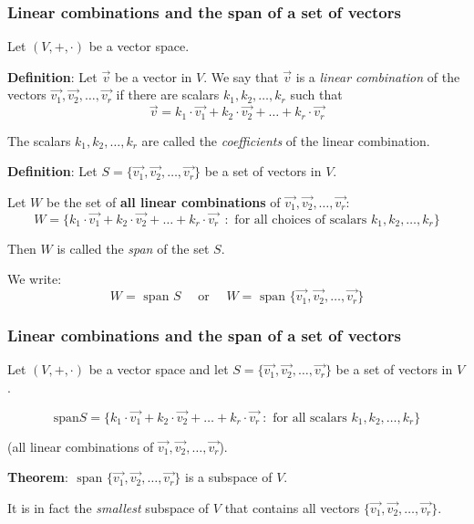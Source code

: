 \begin{frame}[fragile]
\frametitle{Linear combinations and the span of a set of vectors}

Let $(V, +, \cdot)$ be a vector space.



\textbf{Definition}: Let $\vec{v}$ be a vector in $V$. We say that $\vec{v}$ is a {\em linear combination} of the vectors $\vec{v_1}, \vec{v_2}, \ldots, \vec{v_r}$ if there are scalars $k_1, k_2, \ldots, k_r$ such that
$$\vec{v} = k_1 \cdot \vec{v_1} + k_2 \cdot \vec{v_2} + \ldots + k_r \cdot \vec{v_r}$$

The scalars $k_1, k_2, \ldots, k_r$ are called the {\em coefficients} of the linear combination.





\textbf{Definition}: Let $S = \{ \vec{v_1}, \vec{v_2}, \ldots, \vec{v_r} \}$ be a set of vectors in $V$.

Let $W$ be the set of \textbf{all linear combinations} of $\vec{v_1}, \vec{v_2}, \ldots, \vec{v_r}$:
$$W = \{  k_1 \cdot \vec{v_1} + k_2 \cdot \vec{v_2} + \ldots + k_r \cdot \vec{v_r} \ \  \colon  \text{ for all choices of scalars } k_1, k_2, \ldots, k_r \}$$

Then $W$ is called the {\em span} of the set $S$.

We write:
$$W = \text{ span } S  \quad \text{ or } \quad W = \text{ span }   \{ \vec{v_1}, \vec{v_2}, \ldots, \vec{v_r} \}$$

\end{frame}


\begin{frame}[fragile]
\frametitle{Linear combinations and the span of a set of vectors}

Let $(V, +, \cdot)$ be a vector space and let $S = \{ \vec{v_1}, \vec{v_2}, \ldots, \vec{v_r} \}$ be a set of vectors in $V$.

$$\text{span} S = \{  k_1 \cdot \vec{v_1} + k_2 \cdot \vec{v_2} + \ldots + k_r \cdot \vec{v_r}  \ \colon  \text{ for all scalars } k_1, k_2, \ldots, k_r \}$$

(all linear combinations of $\vec{v_1}, \vec{v_2}, \ldots, \vec{v_r}$).

\bigskip


\textbf{Theorem}: $\text{ span }   \{ \vec{v_1}, \vec{v_2}, \ldots, \vec{v_r} \}$ is a subspace of $V$.

It is in fact the {\em smallest} subspace of $V$ that contains all vectors $\{ \vec{v_1}, \vec{v_2}, \ldots, \vec{v_r} \}$.

\end{frame}


